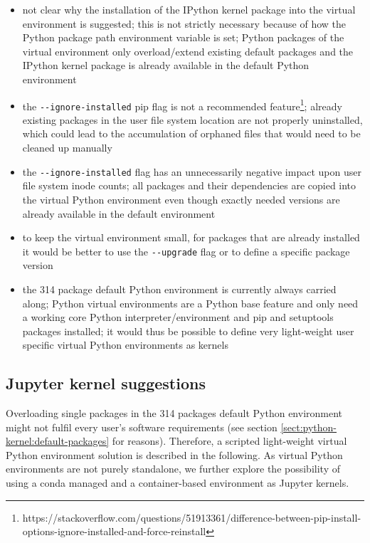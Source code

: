 \begin{itemize}

  \item not clear why the installation of the IPython kernel package into the virtual environment is suggested;
  this is not strictly necessary because of how the Python package path environment variable is set;
  Python packages of the virtual environment only overload/extend existing default packages and the IPython kernel package is already available in the default Python environment

  \item the \verb|--ignore-installed| pip flag is not a recommended feature\footnote{https://stackoverflow.com/questions/51913361/difference-between-pip-install-options-ignore-installed-and-force-reinstall};
  already existing packages in the user file system location are not properly uninstalled, which could lead to the accumulation of orphaned files that would need to be cleaned up manually

  \item the \verb|--ignore-installed| flag has an unnecessarily negative impact upon user file system inode counts;
  all packages and their dependencies are copied into the virtual Python environment even though exactly needed versions are already available in the default environment

  \item to keep the virtual environment small, for packages that are already installed it would be better to use the \verb|--upgrade| flag or to define a specific package version

  \item the 314 package default Python environment is currently always carried along;
  Python virtual environments are a Python base feature and only need a working core Python interpreter/environment and pip and setuptools packages installed;
  it would thus be possible to define very light-weight user specific virtual Python environments as kernels

\end{itemize}

\subsection{Jupyter kernel suggestions}
\label{sect:jupyter-kernel-suggestions}

Overloading single packages in the 314 packages default Python environment might not fulfil every user's software requirements (see section \ref{sect:python-kernel:default-packages} for reasons).
Therefore, a scripted light-weight virtual Python environment solution is described in the following.
As virtual Python environments are not purely standalone, we further explore the possibility of using a conda managed and a container-based environment as Jupyter kernels.

